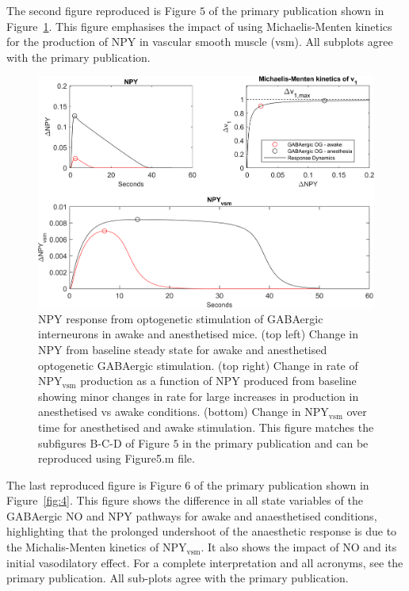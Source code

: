 \documentclass[fleqn,10pt]{physiome}
\begin{document}
The second figure reproduced is Figure $5$ of the primary publication shown in Figure~\ref{fig:3}. This figure emphasises the impact of using Michaelis-Menten kinetics for the production of NPY in vascular smooth muscle (vsm). All subplots agree with the primary publication. 

\begin{figure}[htbp]
    \centering
    \includegraphics[scale=0.8, keepaspectratio]{Figure5.png}
    \caption{NPY response from optogenetic stimulation of GABAergic interneurons in awake and anesthetised mice. (top left) Change in NPY from baseline steady state for awake and anesthetised optogenetic GABAergic stimulation. (top right) Change in rate of NPY$_\mathrm{vsm}$ production as a function of NPY produced from baseline showing minor changes in rate for large increases in production in anesthetised vs awake conditions. (bottom) Change in NPY$_\mathrm{vsm}$ over time for anesthetised and awake stimulation. This figure matches the subfigures B-C-D of Figure $5$ in the primary publication and can be reproduced using Figure5.m file.}
    \label{fig:3}
\end{figure}

The last reproduced figure is Figure $6$ of the primary publication shown in Figure~\ref{fig:4}. This figure shows the difference in all state variables of the GABAergic NO and NPY pathways for awake and anaesthetised conditions, highlighting that the prolonged undershoot of the anaesthetic response is due to the Michalis-Menten kinetics of NPY$_\mathrm{vsm}$. It also shows the impact of NO and its initial vasodilatory effect. For a complete interpretation and all acronyms, see the primary publication. All sub-plots agree with the primary publication. 
\end{document}
